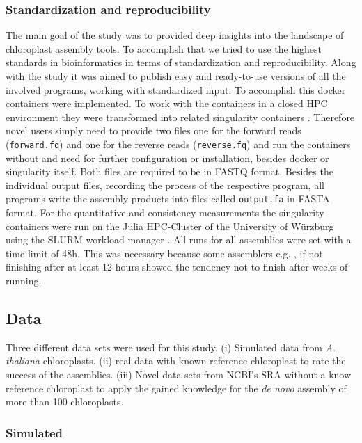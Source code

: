 \subsubsection{Standardization and reproducibility}

The main goal of the study was to provided deep insights into the landscape of chloroplast assembly tools. To
accomplish that we tried to use the highest standards in bioinformatics in terms of standardization and
reproducibility. Along with the study it was aimed to publish easy and ready-to-use versions of all the
involved programs, working with standardized input. To accomplish this docker containers
\cite{merkel2014docker} were implemented.  To work with the containers in a closed HPC environment they were
transformed into related singularity containers \cite{kurtzer2017singularity}. Therefore novel users simply
need to provide two files one for the forward reads (\texttt{forward.fq}) and one for the reverse reads
(\texttt{reverse.fq}) and run the containers without and need for further configuration or installation,
besides docker or singularity itself.  Both files are required to be in FASTQ format.  Besides the individual
output files, recording the process of the respective program, all programs write the assembly products into
files called \texttt{output.fa} in FASTA format.  For the quantitative and consistency measurements the
singularity containers were run on the Julia HPC-Cluster of the University of W\"{u}rzburg using the SLURM
workload manager \cite{Jette02slurm}.  All runs for all assemblies were set with a time limit of 48h. This was
necessary because some assemblers e.g. \ioga, if not finishing after at least 12 hours showed the tendency not
to finish after weeks of running.

\subsection{Data}
Three different data sets were used for this study. (i) Simulated data from \textit{A. thaliana}
chloroplasts. (ii) real data with known reference chloroplast to rate the success of the assemblies. (iii)
Novel data sets from NCBI's SRA without a know reference chloroplast to apply the gained knowledge for the
\textit{de novo} assembly of more than 100 chloroplasts.

\subsubsection{Simulated}

